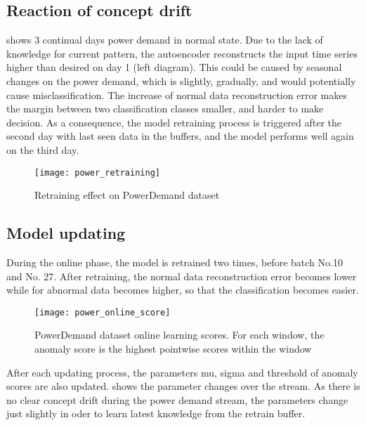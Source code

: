 \subsection{Reaction of concept drift}
\label{sec:reaction}

 shows 3 continual days power demand in normal state. Due to the lack of knowledge for current pattern, the autoencoder reconstructs the input time series higher than desired on day 1 (left diagram). This could be caused by seasonal changes on the power demand, which is slightly, gradually, and would potentially cause misclassification. The increase of normal data reconstruction error makes the margin between two classification classes smaller, and harder to make decision. As a consequence, the model retraining process is triggered after the second day with last seen data in the buffers, and the model performs well again on the third day.\\

\begin{figure}[h]
\centering
\texttt{[image: power\_retraining]}
\caption[Retraining effect on PowerDemand dataset]{Retraining effect on PowerDemand dataset}
\label{fig:power_retraining}
\end{figure}

\subsection{Model updating}
\label{sec:retrainig}

During the online phase, the model is retrained two times, before batch No.10 and No. 27. After retraining, the normal data reconstruction error becomes lower while for abnormal data becomes higher, so that the classification becomes easier.\\

\begin{figure}[h]
\centering
\texttt{[image: power\_online\_score]}
\caption[PowerDemand dataset online learning scores]{PowerDemand dataset online learning scores. For each window, the anomaly score is the highest pointwise scores within the window}
\label{fig:power_online}
\end{figure}

After each updating process, the parameters mu, sigma and threshold of anomaly scores are also updated.  shows the parameter changes over the stream. As there is no clear concept drift during the power demand stream, the parameters change just slightly in oder to learn latest knowledge from the retrain buffer. \\

